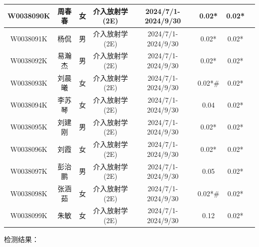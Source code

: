 \begin{table}[H]
\begin{tabular}{|c|c|c|c|c|c|c|c|}
\hline
W0038090K & 周春春 & 女 & 介入放射学(2E) & 2024/7/1-2024/9/30 & 0.02* & 0.02* &  \\
\hline
W0038091K & 杨侃 & 男 & 介入放射学(2E) & 2024/7/1-2024/9/30 & 0.02* & 0.02* &  \\
\hline
W0038092K & 易瀚杰 & 男 & 介入放射学(2E) & 2024/7/1-2024/9/30 & 0.02* & 0.02* &  \\
\hline
W0038093K & 刘晨曦 & 女 & 介入放射学(2E) & 2024/7/1-2024/9/30 & 0.02*\# & 0.02* &  \\
\hline
W0038094K & 李苏琴 & 女 & 介入放射学(2E) & 2024/7/1-2024/9/30 & 0.04 & 0.02* &  \\
\hline
W0038095K & 刘建刚 & 男 & 介入放射学(2E) & 2024/7/1-2024/9/30 & 0.02* & 0.02* &  \\
\hline
W0038096K & 刘霞 & 女 & 介入放射学(2E) & 2024/7/1-2024/9/30 & 0.02* & 0.02* &  \\
\hline
W0038097K & 彭治鹏 & 男 & 介入放射学(2E) & 2024/7/1-2024/9/30 & 0.05 & 0.02* &  \\
\hline
W0038098K & 张涵茹 & 女 & 介入放射学(2E) & 2024/7/1-2024/9/30 & 0.02*\# & 0.02* &  \\
\hline
W0038099K & 朱敏 & 女 & 介入放射学(2E) & 2024/7/1-2024/9/30 & 0.12 & 0.02* &  \\
\hline
\end{tabular}
\end{table}


检测结果：


